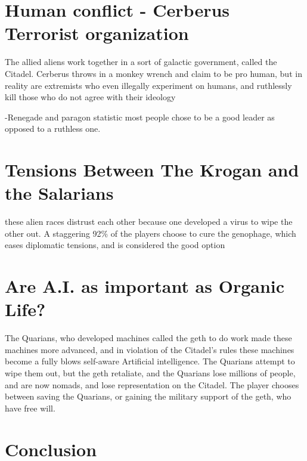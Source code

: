 \documentclass[journal]{IEEEtran}
\begin{document}
\section{Human conflict - Cerberus Terrorist organization}
The allied aliens work together in a sort of galactic government, called the Citadel. Cerberus throws in a monkey wrench and claim to be pro human,
but in reality are extremists who even illegally experiment on humans,
and ruthlessly kill those who do not agree with their ideology

-Renegade and paragon statistic most people chose to be a good leader as opposed to a ruthless one.


\section{Tensions Between The Krogan and the Salarians}
these alien races distrust each other because one developed a virus to wipe the
other out. A staggering 92\% of the players choose to cure the genophage, which
eases diplomatic tensions, and is considered the good option




\section{Are A.I. as important as Organic Life?}
The Quarians, who developed machines called the geth to do work made these
machines more advanced, and in violation of the Citadel's rules these machines
become a fully blows self-aware Artificial intelligence. The Quarians attempt to wipe them out, but the geth retaliate, and the Quarians lose millions of people, and are now nomads, and lose representation on the Citadel.
The player chooses between saving the Quarians, or gaining the military support of the geth, who have free will.

\section{Conclusion}
\lipsum[7]

\nocite{*}


\end{document}
